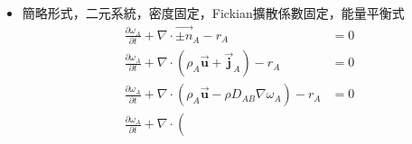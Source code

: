 \documentclass[../main.tex]{subfiles}
\begin{document}
\begin{itemize}
\begin{itemize}
\begin{align}
    &= - C D_{AB} \cdot \frac{\overline{M}^2}{M_A M_B} \nabla \omega_A 
  \end{align}
  由(\ref{eq:molar_to_mass_diffusion_flux})，可得
  \begin{equation}
    \vec{\bm j}_A = \frac{M_A \omega_B}{x_B} \vec{\bm J}_A
  \end{equation}
  代入:
  \begin{align}
    \vec{\bm j}_A &= -CD_{AB}\cdot\left(
      \frac{M_A \omega_B}{x_B}
    \right)\cdot \frac{\overline{M}^2}{M_A M_B} \nabla \omega_A \nonumber\\
    &= -CD_{AB} \cdot \frac{\omega_B}{x_B} \cdot \frac{\overline{M}^2}{M_B} \nabla \omega_A
  \end{align}
  而$C\cdot \overline{M} = \rho$，$x_B = \omega_B\frac{\overline{M}}{M_B}$\\
  故
  \begin{align}
    \vec{\bm j}_A &= - CD_{AB} \cdot \frac{\omega_B}{x_B} \cdot \frac{\overline{M}^2}{M_B} \nabla \omega_A \nonumber\\
    &= - \underbrace{C\overline{M}}_{\rho} D_{AB}\cdot \left(
      \underbrace{\omega_B\frac{\overline{M}}{M_B}}_{x_B}\cdot \frac{1}{x_B}
    \right) \nabla \omega_A \nonumber\\
    &= - \rho D_{AB} \nabla \omega_A
  \end{align}
  因此以質量分率表示的Fick's Law為
  \begin{equation}
    \boxed{\vec{\bm j}_A = - \rho D_{AB} \nabla \omega_A} \label{eq:ficks_law_mass_fraction}
  \end{equation}
  或者:
  \begin{equation}
    \vec{\bm n}_A = \rho_A \vec{\bm u}^\ast - \rho D_{AB} \nabla \omega_A
  \end{equation}
  注意這只有二元系統可以這樣換
  \item 簡略形式，二元系統，密度固定，Fickian擴散係數固定，能量平衡式
  \begin{align}
    \frac{\partial \omega_A}{\partial t} + \nabla \cdot \vec{\pm n}_A -r_A &= 0 \nonumber\\
    \frac{\partial \omega_A}{\partial t} + \nabla \cdot \left(
      \rho_A \vec{\bm u} + \vec{\bm j}_A
    \right) - r_A &= 0 \nonumber\\
    \frac{\partial \omega_A}{\partial t} + \nabla \cdot \left(
      \rho_A \vec{\bm u} - \rho D_{AB} \nabla \omega_A
    \right) - r_A &= 0 \nonumber\\
    \frac{\partial \omega_A}{\partial t} + \nabla \cdot \left(

\end{align}
\end{itemize}
\end{itemize}
\end{document}

